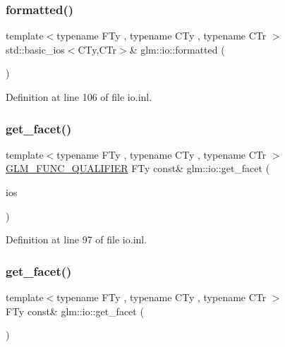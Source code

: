 \mbox{\label{namespaceglm_1_1io_a892800782557e1591ffcf8460578f8a8}} 
\subsubsection{\texorpdfstring{formatted()}{formatted()}\hspace{0.1cm}{\footnotesize\ttfamily [2/2]}}
{\footnotesize\ttfamily template$<$typename F\+Ty , typename C\+Ty , typename C\+Tr $>$ \\
std\+::basic\+\_\+ios$<$C\+Ty,C\+Tr$>$\& glm\+::io\+::formatted (\begin{DoxyParamCaption}\item[{std\+::basic\+\_\+ios$<$ C\+Ty, C\+Tr $>$ \&}]{ }\end{DoxyParamCaption})}



Definition at line 106 of file io.\+inl.

\mbox{\label{namespaceglm_1_1io_a9e8927cf032254b0eee4ec650286e1f9}} 
\subsubsection{\texorpdfstring{get\_facet()}{get\_facet()}\hspace{0.1cm}{\footnotesize\ttfamily [1/2]}}
{\footnotesize\ttfamily template$<$typename F\+Ty , typename C\+Ty , typename C\+Tr $>$ \\
\mbox{\hyperlink{setup_8hpp_a33fdea6f91c5f834105f7415e2a64407}{G\+L\+M\+\_\+\+F\+U\+N\+C\+\_\+\+Q\+U\+A\+L\+I\+F\+I\+ER}} F\+Ty const\& glm\+::io\+::get\+\_\+facet (\begin{DoxyParamCaption}\item[{std\+::basic\+\_\+ios$<$ C\+Ty, C\+Tr $>$ \&}]{ios }\end{DoxyParamCaption})}



Definition at line 97 of file io.\+inl.

\mbox{\label{namespaceglm_1_1io_a7ae96c71704bbf3c6e61543a7e731bc4}} 
\subsubsection{\texorpdfstring{get\_facet()}{get\_facet()}\hspace{0.1cm}{\footnotesize\ttfamily [2/2]}}
{\footnotesize\ttfamily template$<$typename F\+Ty , typename C\+Ty , typename C\+Tr $>$ \\
F\+Ty const\& glm\+::io\+::get\+\_\+facet (\begin{DoxyParamCaption}\item[{std\+::basic\+\_\+ios$<$ C\+Ty, C\+Tr $>$ \&}]{ }\end{DoxyParamCaption})}



